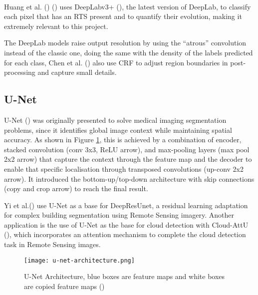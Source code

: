 \paragraph{}
Huang et al. (\cite{HUANG2020111534}) (\cite{HUANG2021102399}) uses DeepLabv3+ (\cite{Chen_2018_ECCV}), the latest version of DeepLab, to classify each pixel that has an \gls{RTS} present and to quantify their evolution, making it extremely relevant to this project.

The DeepLab models raise output resolution by using the “atrous” convolution instead of the classic one, doing the same with the density of the labels predicted for each class, Chen et al. (\cite{chen2017deeplab}) also use \gls{CRF} to adjust region boundaries in post-processing and capture small details.

\subsection{U-Net}
U-Net (\cite{ronneberger2015unet}) was originally presented to solve medical imaging segmentation problems, since it identifies global image context while maintaining spatial accuracy. As shown in Figure \ref{fig_unet}, this is achieved by a combination of encoder, stacked convolution (conv 3x3, \gls{ReLU} arrow), and max-pooling layers (max pool 2x2 arrow) that capture the context through the feature map and the decoder to enable that specific localisation through transposed convolutions (up-conv 2x2 arrow). It introduced the bottom-up/top-down architecture with skip connections (copy and crop arrow) to reach the final result.

Yi et al.(\cite{rs11151774}) use U-Net as a base for DeepResUnet, a residual learning adaptation for complex building segmentation using Remote Sensing imagery. Another application is the use of U-Net as the base for cloud detection with Cloud-AttU (\cite{sym12061056}), which incorporates an attention mechanism to complete the cloud detection task in Remote Sensing images.

    \begin{figure}[hbt!]
        \centering
        \texttt{[image: u-net-architecture.png]}
        \caption{U-Net Architecture, blue boxes are feature maps and white boxes are copied feature maps (\cite{ronneberger2015unet})}
        \label{fig_unet}
    \end{figure}